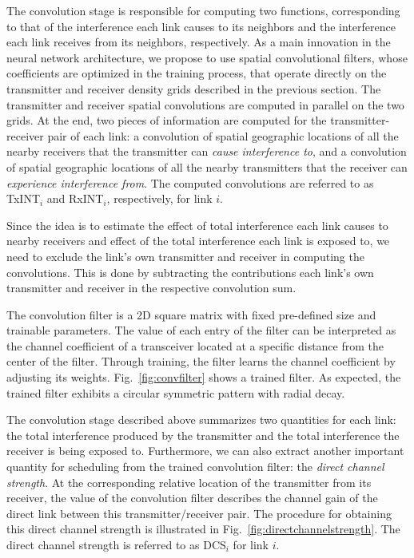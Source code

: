 \documentclass[journal,12pt,onecolumn,draftclsnofoot,]{IEEEtran}
\begin{document}
The convolution stage is responsible for computing two functions, corresponding
to that of the interference each link causes to its neighbors and the
interference each link receives from its neighbors, respectively. As a main
innovation in the neural network architecture, we propose to use spatial convolutional
filters, whose coefficients are optimized in the training process, that
operate directly on the transmitter and receiver density grids described in
the previous section. The transmitter and receiver spatial convolutions are
computed in parallel on the two grids. At the end, two pieces of information
are computed for the transmitter-receiver pair of each link: a convolution of spatial
geographic locations of all the nearby receivers that the transmitter can
\emph{cause interference to}, and a convolution of spatial geographic locations of all
the nearby transmitters that the receiver can \emph{experience interference from}.
The computed convolutions are referred to as TxINT$_i$ and RxINT$_i$, respectively,
for link $i$.


Since the idea is to estimate the effect of total interference each link causes
to nearby receivers and effect of the total interference each link is exposed
to, we need to exclude the link's own transmitter and receiver in computing the
convolutions. This is done by subtracting the contributions each link's
own transmitter and receiver in the respective convolution sum.

The convolution filter is a 2D square matrix with fixed pre-defined size and
trainable parameters. The value of each entry of the filter can be interpreted
as the channel coefficient of a transceiver located at a specific distance from
the center of the filter. Through training, the filter
learns the channel coefficient by adjusting its weights.
Fig.~\ref{fig:convfilter} shows a trained filter. As expected, the trained filter
exhibits a circular symmetric pattern with radial decay.


The convolution stage described above summarizes two quantities for each link:
the total interference produced by the transmitter and the total interference
the receiver is being exposed to. 
Furthermore, we can also extract another important quantity for scheduling from
the trained convolution filter: the \emph{direct channel strength}. At the
corresponding relative location of the transmitter from its receiver, the value
of the convolution filter describes the channel gain of the direct link between this transmitter/receiver pair. The procedure for obtaining this direct channel strength is illustrated in Fig.~\ref{fig:directchannelstrength}. The direct channel strength is referred to as DCS$_i$ for link $i$.
\end{document}

